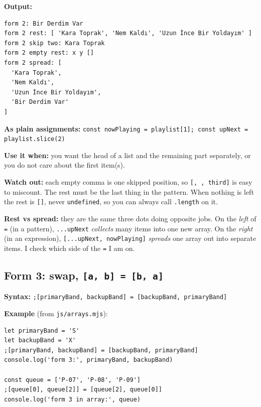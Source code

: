 \textbf{Output:}

\begin{lstlisting}
form 2: Bir Derdim Var
form 2 rest: [ 'Kara Toprak', 'Nem Kaldı', 'Uzun İnce Bir Yoldayım' ]
form 2 skip two: Kara Toprak
form 2 empty rest: x y []
form 2 spread: [
  'Kara Toprak',
  'Nem Kaldı',
  'Uzun İnce Bir Yoldayım',
  'Bir Derdim Var'
]
\end{lstlisting}

\textbf{As plain assignments:} \passthrough{\lstinline!const nowPlaying = playlist[1]; const upNext = playlist.slice(2)!}

\textbf{Use it when:} you want the head of a list and the remaining part separately, or you do not care about the first item(s).

\textbf{Watch out:} each empty comma is one skipped position, so \passthrough{\lstinline![, , third]!} is easy to miscount. The rest must be the last thing in the pattern. When nothing is left the rest is \passthrough{\lstinline![]!}, never \passthrough{\lstinline!undefined!}, so you can always call \passthrough{\lstinline!.length!} on it.

\textbf{Rest vs spread:} they are the same three dots doing opposite jobs. On the \emph{left} of \passthrough{\lstinline!=!} (in a pattern), \passthrough{\lstinline!...upNext!} \emph{collects} many items into one new array. On the \emph{right} (in an expression), \passthrough{\lstinline![...upNext, nowPlaying]!} \emph{spreads} one array out into separate items. I check which side of the \passthrough{\lstinline!=!} I am on.

\hypertarget{form-3-swap-a-b--b-a}{%
\subsection{\texorpdfstring{Form 3: swap, \texttt{{[}a,\ b{]}\ =\ {[}b,\ a{]}}}{Form 3: swap, {[}a, b{]} = {[}b, a{]}}}\label{form-3-swap-a-b--b-a}}

\textbf{Syntax:} \passthrough{\lstinline!;[primaryBand, backupBand] = [backupBand, primaryBand]!}

\textbf{Example} (from \passthrough{\lstinline!js/arrays.mjs!}):

\begin{lstlisting}
let primaryBand = 'S'
let backupBand = 'X'
;[primaryBand, backupBand] = [backupBand, primaryBand]
console.log('form 3:', primaryBand, backupBand)

const queue = ['P-07', 'P-08', 'P-09']
;[queue[0], queue[2]] = [queue[2], queue[0]]
console.log('form 3 in array:', queue)
\end{lstlisting}

